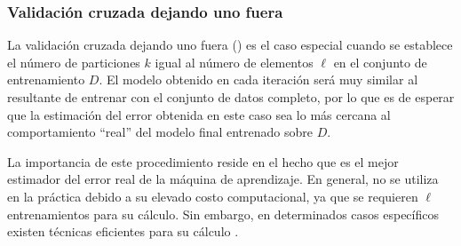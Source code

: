 %
\subsubsection{Validación cruzada dejando uno fuera}
%
La validación cruzada dejando uno fuera () es el caso
especial cuando se establece el número de particiones $k$ igual al
número de elementos $\ell$ en el conjunto de entrenamiento $D$.  El
modelo obtenido en cada iteración será muy similar al resultante de
entrenar con el conjunto de datos completo, por lo que es de esperar
que la estimación del error obtenida en este caso sea lo más cercana
al comportamiento ``real'' del modelo final entrenado sobre $D$.

La importancia de este procedimiento reside en el hecho que es el
mejor estimador del error real de la máquina de aprendizaje.  En
general, no se utiliza en la práctica debido a su elevado costo
computacional, ya que se requieren $\ell$ entrenamientos para su
cálculo.  Sin embargo, en determinados casos específicos existen
técnicas eficientes para su cálculo \cite{chapelle,lee-keerthi}.
